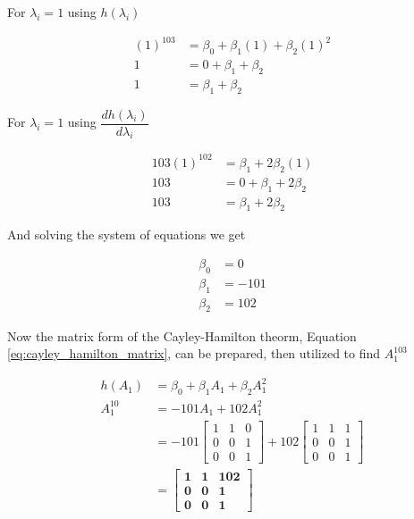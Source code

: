 For $\lambda_i = 1$ using $h(\lambda_i)$


\begin{align}
  (1)^{103} &= \beta_0 + \beta_1 (1) + \beta_2 (1)^2 \nonumber \\
          1 &= 0 + \beta_1 + \beta_2 \nonumber \\
          1 &= \beta_1 + \beta_2
\end{align}

For $\lambda_i = 1$ using $\dfrac{d h(\lambda_i)}{d \lambda_i}$


\begin{align}
  103(1)^{102} &=  \beta_1 + 2 \beta_2 (1) \nonumber \\
           103 &= 0 + \beta_1 + 2 \beta_2 \nonumber \\
           103 &= \beta_1 + 2 \beta_2
\end{align}

And solving the system of equations we get

\begin{align}
  \beta_0 &= 0  \nonumber \\
  \beta_1 &= -101 \\
  \beta_2 &= 102  \nonumber
\end{align}

Now the matrix form of the Cayley-Hamilton theorm, 
Equation \ref{eq:cayley_hamilton_matrix}, can be prepared, then utilized to find
$A_1^{103}$

\begin{align}
  h(A_1)   &= \beta_0 + \beta_1 A_1 + \beta_2 A_1^2 \nonumber \\
  A_1^{10} &= -101 A_1 + 102 A_1^2 \nonumber \\
           &= -101 \begin{bmatrix} 
                  1 & 1 & 0 \\ 
                  0 & 0 & 1 \\
                  0 & 0 & 1
                \end{bmatrix} \nonumber
              + 102 \begin{bmatrix} 
                  1 & 1 & 1 \\ 
                  0 & 0 & 1 \\
                  0 & 0 & 1
                \end{bmatrix} \nonumber \\
           &= \mathbf{
           \begin{bmatrix} 
              1 & 1 & 102 \\ 
              0 & 0 & 1 \\
              0 & 0 & 1
           \end{bmatrix}
           } \nonumber \\
\end{align}


